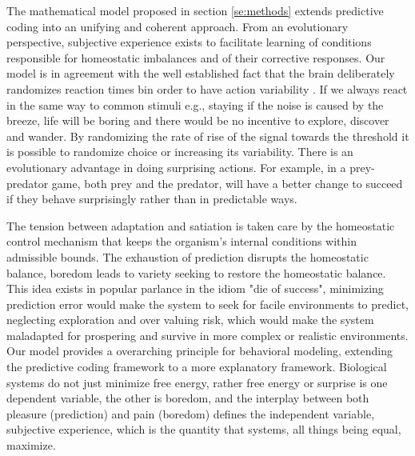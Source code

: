\documentclass[11pt,twocolumn]{article}
\begin{document}
The mathematical model proposed  in section \ref{se:methods} extends predictive coding into an unifying and coherent  approach. From an evolutionary perspective, subjective experience exists to facilitate learning of conditions responsible for homeostatic imbalances and of their corrective responses.  
Our model is in agreement with the well established fact that the brain deliberately randomizes reaction times bin order to have action variability \citep{carpenter_neural_1999}. If we always react in the same way to common stimuli e.g., staying if the noise is caused by the breeze, life will be boring and there would be no incentive to explore, discover and wander. 
By randomizing the rate of rise of the signal towards the threshold it is possible to randomize  choice or increasing its variability. There is an evolutionary advantage in doing surprising actions. For example, in a prey-predator game, both prey and the predator, will have a better change to succeed if they behave surprisingly rather than in predictable ways. 

The tension between adaptation and satiation is taken care by the homeostatic control mechanism that keeps the organism's internal conditions within admissible bounds. 
The exhaustion of prediction disrupts the homeostatic balance, boredom leads to variety seeking to restore the homeostatic balance. This idea exists in popular parlance in the idiom "die of success", minimizing prediction error would make the system to seek for facile environments to predict, neglecting exploration and over valuing risk, which would make the system maladapted for prospering and survive in more complex or realistic environments. 
Our model provides a overarching principle for behavioral modeling, extending the predictive coding framework to a more explanatory framework. Biological systems do not just minimize free energy, rather free energy or surprise is one dependent variable, the other is boredom, and the interplay between both pleasure (prediction) and pain (boredom) defines the independent variable, subjective experience, which is the quantity that systems, all things being equal, maximize.  
\end{document}
